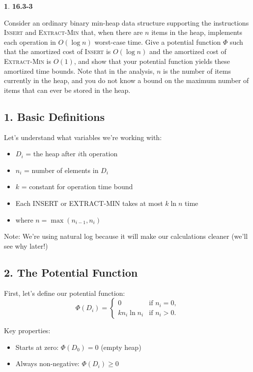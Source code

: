 \documentclass[11pt]{article}
\theoremstyle{definition}
\newtheorem{prob}{}
\newcommand{\solution}{\medskip\noindent{\color{DarkBlue}\textbf{Solution:}}}
\begin{document}
\solution

\begin{prob} \textbf{16.3-3}
\end{prob}
\noindent Consider an ordinary binary min-heap data structure supporting the instructions \textsc{Insert} and \textsc{Extract-Min} that, when there are $n$ items in the heap, implements each operation in $O(\log n)$ worst-case time. Give a potential function $\Phi$ such that the amortized cost of \textsc{Insert} is $O(\log n)$ and the amortized cost of \textsc{Extract-Min} is $O(1)$, and show that your potential function yields these amortized time bounds. Note that in the analysis, $n$ is the number of items currently in the heap, and you do not know a bound on the maximum number of items that can ever be stored in the heap.

\solution

\subsection*{1. Basic Definitions}
Let's understand what variables we're working with:
\begin{itemize}
  \item $D_i$ = the heap after $i$th operation
  \item $n_i$ = number of elements in $D_i$
  \item $k$ = constant for operation time bound
  \item Each INSERT or EXTRACT-MIN takes at most $k \ln n$ time
  \item where $n = \max(n_{i-1}, n_i)$
\end{itemize}
Note: We're using natural log because it will make our calculations cleaner (we'll see why later!)

\subsection*{2. The Potential Function}
First, let's define our potential function:
\[
\Phi(D_i) = \begin{cases}
0 & \text{if } n_i = 0, \\
kn_i \ln n_i & \text{if } n_i > 0.
\end{cases}
\]

Key properties:
\begin{itemize}
  \item Starts at zero: $\Phi(D_0) = 0$ (empty heap)
  \item Always non-negative: $\Phi(D_i) \geq 0$
\end{itemize}
\end{document}
